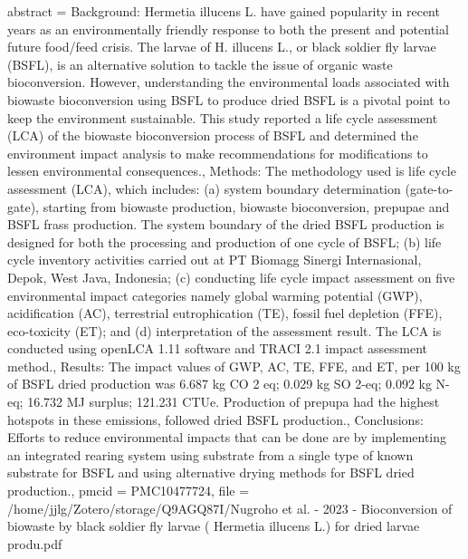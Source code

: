{{{{{  abstract = {Background: Hermetia illucens L. have gained popularity in recent years as an environmentally friendly response to both the present and potential future food/feed crisis. The larvae of H. illucens L., or black soldier fly larvae (BSFL), is an alternative solution to tackle the issue of organic waste bioconversion. However, understanding the environmental loads associated with biowaste bioconversion using BSFL to produce dried BSFL is a pivotal point to keep the environment sustainable. This study reported a life cycle assessment (LCA) of the biowaste bioconversion process of BSFL and determined the environment impact analysis to make recommendations for modifications to lessen environmental consequences.,  Methods: The methodology used is life cycle assessment (LCA), which includes: (a) system boundary determination (gate-to-gate), starting from biowaste production, biowaste bioconversion, prepupae and BSFL frass production. The system boundary of the dried BSFL production is designed for both the processing and production of one cycle of BSFL; (b) life cycle inventory activities carried out at PT Biomagg Sinergi Internasional, Depok, West Java, Indonesia; (c) conducting life cycle impact assessment on five environmental impact categories namely global warming potential (GWP), acidification (AC), terrestrial eutrophication (TE), fossil fuel depletion (FFE), eco-toxicity (ET); and (d) interpretation of the assessment result. The LCA is conducted using openLCA 1.11 software and TRACI 2.1 impact assessment method.,  Results: The impact values of GWP, AC, TE, FFE, and ET, per 100 kg of BSFL dried production was 6.687 kg CO 2 eq; 0.029 kg SO 2-eq; 0.092 kg N-eq; 16.732 MJ surplus; 121.231 CTUe. Production of prepupa had the highest hotspots in these emissions, followed dried BSFL production.,  Conclusions: Efforts to reduce environmental impacts that can be done are by implementing an integrated rearing system using substrate from a single type of known substrate for BSFL and using alternative drying methods for BSFL dried production.},
  pmcid = {PMC10477724},
  file = {/home/jjlg/Zotero/storage/Q9AGQ87I/Nugroho et al. - 2023 - Bioconversion of biowaste by black soldier fly larvae ( Hermetia illucens L.) for dried larvae produ.pdf}
}

}}}}
